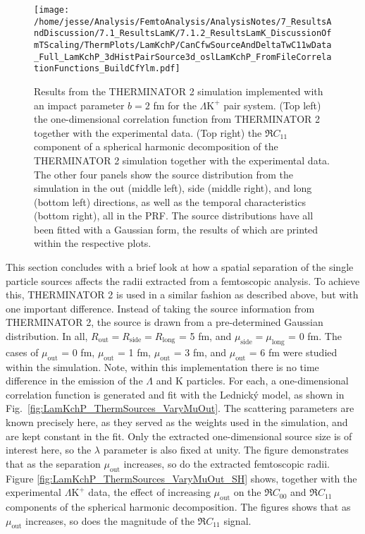 \documentclass[ALICE,manyauthors]{cernphprep}
\newcommand{\Lam}{$\Lambda$\xspace}
\newcommand{\LamKchP}{$\Lambda\mathrm{K^{+}}$\xspace}
\begin{document}
\begin{figure}[h!]
  \centering
  \texttt{[image: /home/jesse/Analysis/FemtoAnalysis/AnalysisNotes/7\_ResultsAndDiscussion/7.1\_ResultsLamK/7.1.2\_ResultsLamK\_DiscussionOfmTScaling/ThermPlots/LamKchP/CanCfwSourceAndDeltaTwC11wData\_Full\_LamKchP\_3dHistPairSource3d\_oslLamKchP\_FromFileCorrelationFunctions\_BuildCfYlm.pdf]}
  \caption[THERMINATOR 2 simulatin for \LamKchP]
  {
  Results from the THERMINATOR 2 simulation implemented with an impact parameter $b = 2$ fm for the \LamKchP pair system.
  (Top left) the one-dimensional correlation function from THERMINATOR 2 together with the experimental data.
  (Top right) the $\Re C_{11}$ component of a spherical harmonic decomposition of the THERMINATOR 2 simulation together with the experimental data.
  The other four panels show the source distribution from the simulation in the out (middle left), side (middle right), and long (bottom left) directions, as well as the temporal characteristics (bottom right), all in the PRF.
  The source distributions have all been fitted with a Gaussian form, the results of which are printed within the respective plots.
  }
  \label{fig:LamKchP_StdThermSources}
\end{figure}



This section concludes with a brief look at how a spatial separation of the single particle sources affects the radii extracted from a femtoscopic analysis.
To achieve this, THERMINATOR 2 is used in a similar fashion as described above, but with one important difference.
Instead of taking the source information from THERMINATOR 2, the source is drawn from a pre-determined Gaussian distribution.
In all, $R_{\mathrm{out}} = R_{\mathrm{side}} = R_{\mathrm{long}}$ = 5 fm, and $\mu_{\mathrm{side}} = \mu_{\mathrm{long}}$ = 0 fm.
The cases of $\mu_{\mathrm{out}}$ = 0 fm, $\mu_{\mathrm{out}}$ = 1 fm, $\mu_{\mathrm{out}}$ = 3 fm, and $\mu_{\mathrm{out}}$ = 6 fm were studied within the simulation.
Note, within this implementation there is no time difference in the emission of the \Lam and K particles.
For each, a one-dimensional correlation function is generated and fit with the Lednick\'y model, as shown in Fig.\ \ref{fig:LamKchP_ThermSources_VaryMuOut}.
The scattering parameters are known precisely here, as they served as the weights used in the simulation, and are kept constant in the fit.
Only the extracted one-dimensional source size is of interest here, so the $\lambda$ parameter is also fixed at unity.
The figure demonstrates that as the separation $\mu_{\mathrm{out}}$ increases, so do the extracted femtoscopic radii.
Figure \ref{fig:LamKchP_ThermSources_VaryMuOut_SH} shows, together with the experimental \LamKchP data, the effect of increasing $\mu_{\mathrm{out}}$ on the $\Re C_{00}$ and $\Re C_{11}$ components of the spherical harmonic decomposition.
The figures shows that as $\mu_{\mathrm{out}}$ increases, so does the magnitude of the $\Re C_{11}$ signal.
\end{document}
